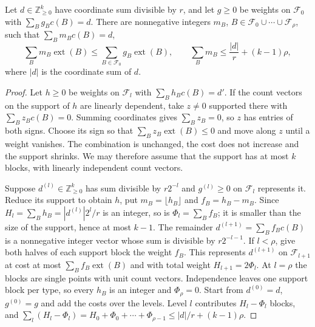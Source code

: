 \begin{lemma}\label{lem:rate-rounding}
Let $d\in\mathbb Z_{\ge0}^k$ have coordinate sum divisible by $r$, and let
$g\ge0$ be weights on $\mathcal F_0$ with $\sum_Bg_Bc(B)=d$. There are
nonnegative integers $m_B$, $B\in\mathcal F_0\cup\cdots\cup\mathcal F_\rho$,
such that $\sum_Bm_Bc(B)=d$,
\[
 \sum_Bm_B\operatorname{ext}(B)\le\sum_{B\in\mathcal F_0}g_B\operatorname{ext}(B),
 \qquad
 \sum_Bm_B\le\frac{|d|}{r}+(k-1)\rho,
\]
where $|d|$ is the coordinate sum of $d$.
\end{lemma}
\begin{proof}
Let $h\ge0$ be weights on $\mathcal F_l$ with $\sum_Bh_Bc(B)=d'$. If the
count vectors on the support of $h$ are linearly dependent, take $z\ne0$
supported there with $\sum_Bz_Bc(B)=0$. Summing coordinates gives
$\sum_Bz_B=0$, so $z$ has entries of both signs. Choose its sign so that
$\sum_Bz_B\operatorname{ext}(B)\le0$ and move along $z$ until a weight
vanishes. The combination is unchanged, the cost does not increase and the
support shrinks. We may therefore assume that the support has at most $k$
blocks, with linearly independent count vectors.

Suppose $d^{(l)}\in\mathbb Z_{\ge0}^k$ has sum divisible by $r2^{-l}$ and
$g^{(l)}\ge0$ on $\mathcal F_l$ represents it. Reduce its support to
obtain $h$, put $m_B=\lfloor h_B\rfloor$ and $f_B=h_B-m_B$. Since
$H_l=\sum_Bh_B=|d^{(l)}|2^l/r$ is an integer, so is $\Phi_l=\sum_Bf_B$; it
is smaller than the size of the support, hence at most $k-1$. The remainder
$d^{(l+1)}=\sum_Bf_Bc(B)$ is a nonnegative integer vector whose sum is
divisible by $r2^{-l-1}$. If $l<\rho$, give both halves of each support
block the weight $f_B$. This represents $d^{(l+1)}$ on $\mathcal F_{l+1}$
at cost at most $\sum_Bf_B\operatorname{ext}(B)$ and with total weight
$H_{l+1}=2\Phi_l$. At $l=\rho$ the blocks are single points with unit count
vectors. Independence leaves one support block per type, so every $h_B$
is an integer and $\Phi_\rho=0$. Start from $d^{(0)}=d$, $g^{(0)}=g$ and
add the costs over the levels. Level $l$ contributes $H_l-\Phi_l$ blocks,
and $\sum_l(H_l-\Phi_l)=H_0+\Phi_0+\cdots+\Phi_{\rho-1}\le|d|/r+(k-1)\rho$.
\end{proof}

